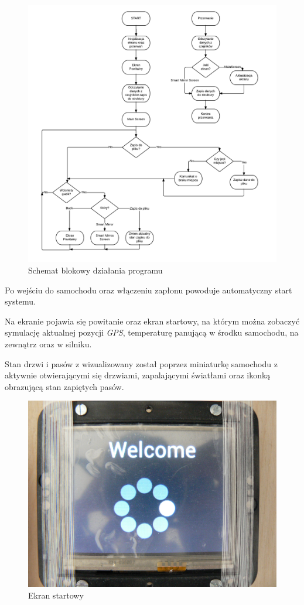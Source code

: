 \documentclass{xmgr}
\begin{document}
\begin{figure}[!hp]
    \centering
    	\includegraphics[height=0.6\textheight]{images/codeDiagram.png}
    \caption{Schemat blokowy działania programu}
\end{figure}

Po wejściu do samochodu oraz włączeniu zapłonu powoduje automatyczny start systemu. 

Na ekranie pojawia się powitanie oraz ekran startowy, na którym można zobaczyć symulację aktualnej pozycji \emph{GPS}, temperaturę panującą w środku samochodu, na zewnątrz oraz w silniku. 

Stan drzwi i pasów z wizualizowany został poprzez miniaturkę samochodu z aktywnie otwierającymi się drzwiami, zapalającymi światłami oraz ikonką obrazującą stan zapiętych pasów.

\begin{figure}[!h]
    \centering
    	\includegraphics[height=0.3\textheight]{images/start.JPG}
    \caption{Ekran startowy}
\end{figure} 
\end{document}
